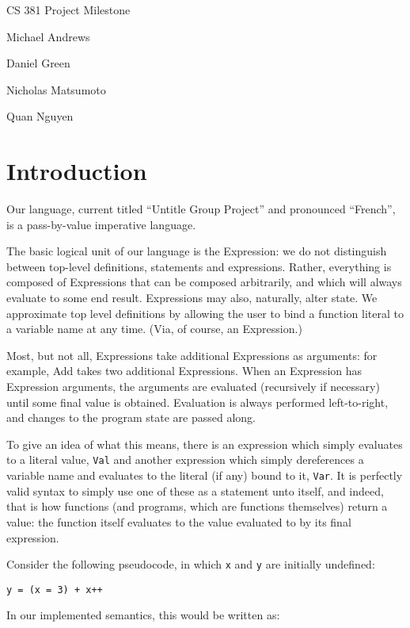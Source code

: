 \documentclass{article}
\begin{document}
\begin{flushleft}
CS 381 Project Milestone

Michael Andrews

Daniel Green

Nicholas Matsumoto

Quan Nguyen
\end{flushleft}

\section*{Introduction}

Our language, current titled ``Untitle Group Project'' and pronounced ``French'', is a pass-by-value imperative language.

The basic logical unit of our language is the Expression: we do not distinguish between top-level definitions, statements and expressions.  Rather, everything is composed of Expressions that can be composed arbitrarily, and which will always evaluate to some end result.  Expressions may also, naturally, alter state.  We approximate top level definitions by allowing the user to bind a function literal to a variable name at any time.  (Via, of course, an Expression.)

Most, but not all, Expressions take additional Expressions as arguments: for example, Add takes two additional Expressions.  When an Expression has Expression arguments, the arguments are evaluated (recursively if necessary) until some final value is obtained.  Evaluation is always performed left-to-right, and changes to the program state are passed along.

To give an idea of what this means, there is an expression which simply evaluates to a literal value, \texttt{Val} and another expression which simply dereferences a variable name and evaluates to the literal (if any) bound to it, \texttt{Var}.  It is perfectly valid syntax to simply use one of these as a statement unto itself, and indeed, that is how functions (and programs, which are functions themselves) return a value: the function itself evaluates to the value evaluated to by its final expression.

Consider the following pseudocode, in which \texttt{x} and \texttt{y} are initially undefined:

\begin{lstlisting}
y = (x = 3) + x++
\end{lstlisting}

In our implemented semantics, this would be written as:
\end{document}

